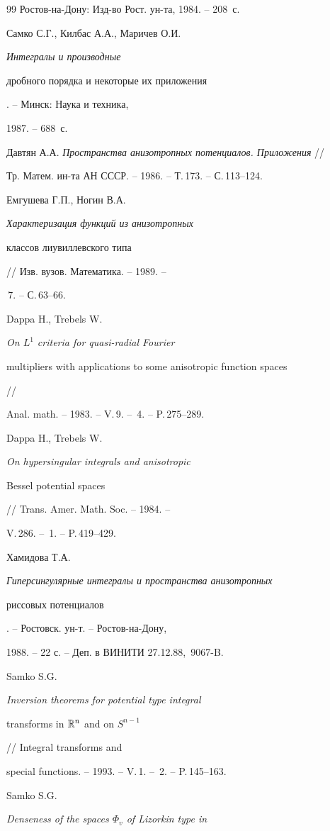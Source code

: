 \begin{thebibliography}{99}
Ростов-на-Дону: Изд-во Рост. ун-та, 1984. -- 208~с.




Самко С.Г., Килбас А.А., Маричев О.И. {\em Интегралы и производные


дробного порядка и некоторые их приложения}. -- Минск: Наука и техника,


1987. -- 688~с.




Давтян А.А. {\em Пространства анизотропных потенциалов. Приложения} //


Тр. Матем. ин-та АН СССР. -- 1986. -- Т.\,173. -- С.\,113--124.




Емгушева Г.П., Ногин В.А. {\em Характеризация функций из анизотропных


классов лиувиллевского типа} // Изв. вузов. Математика. -- 1989. --


\No\,7. -- С.\,63--66.




Dappa H., Trebels W. {\em On $L^1$ criteria for quasi-radial Fourier


multipliers with applications to some anisotropic function spaces} //


Anal. math. -- 1983. -- V.\,9. -- \No\,4. -- P.\,275--289.




Dappa H., Trebels W. {\em On hypersingular integrals and anisotropic


Bessel potential spaces} // Trans. Amer. Math. Soc. -- 1984. --


V.\,286. -- \No\,1. -- P.\,419--429.




Хамидова Т.А. {\em Гиперсингулярные интегралы и пространства анизотропных


риссовых потенциалов}. -- Ростовск. ун-т. -- Ростов-на-Дону,


1988. -- 22 с. -- Деп. в ВИНИТИ 27.12.88, \No\,9067-B.




Samko S.G. {\em Inversion theorems for potential type integral


transforms in $\Bbb R^n$ and on $S^{n-1}$} // Integral transforms and


special functions. -- 1993. -- V.\,1. -- \No\,2. -- P.\,145--163.




Samko S.G. {\em Denseness of the spaces $\Phi_v$ of Lizorkin type in


}
\end{thebibliography}
